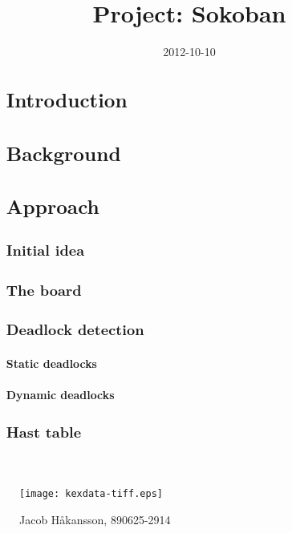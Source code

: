 \documentclass[article,11pt]{article}
\title{Project: Sokoban}
\date{2012-10-10}
\begin{document}
\frontmatter
\maketitle
{}
\begin{figure}[h]
\texttt{[image: kexdata-tiff.eps]}
\caption{Jacob Håkansson, 890625-2914}
\end{figure}

\newpage

\pagestyle{plain}

\begin{abstract}

\newpage
\mainmatter
\section{Introduction}


\section{Background}

\section{Approach}
\subsection{Initial idea}


\subsection{The board}


\subsection{Deadlock detection}

\subsubsection{Static deadlocks}

\subsubsection{Dynamic deadlocks}

\subsection{Hast table}


\end{abstract}
\end{document}
